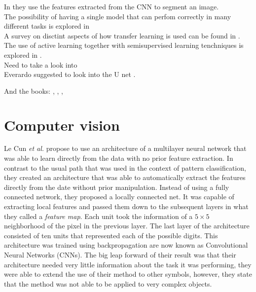 In \cite{DBLP:journals/corr/LongSD14} they use the features extracted from the CNN to segment an image.\\

The possibility of having a single model that can perfom correctly in many different tasks is explored in \cite{DBLP:journals/corr/KaiserGSVPJU17}\\

A survey on disctint aspects of how transfer learning is used can be found in \cite{5288526}.\\

The use of active learning together with semisupervised learning tenchniques is explored in \cite{7956153}.\\

Need to take a look into \cite{DBLP:journals/corr/ChenPKMY14}\\

Everardo suggested to look into the U net \cite{DBLP:journals/corr/RonnebergerFB15}.


And the books: \cite{canty2014image}, \cite{richards2013remote}, \cite{tso2009classification} ,\cite{hastie01statisticallearning}




\section{Computer vision}

Le Cun \textit{et al.} \cite{119325} propose to use an architecture of a multilayer neural network that was able to learn directly from the data with no prior feature extraction. In contrast to the usual path that was used in the context of pattern classification, they created an architecture that was able to automatically extract the features directly from the date without prior manipulation. Instead of using a fully connected network, they proposed a locally connected net. It was capable of extracting local features and passed them down to the subsequent layers in what they called a \textit{feature map}. Each unit took the information of a $5\times 5$ neighborhood of the pixel in the previous layer. The last layer of the architecture consisted of ten units that represented each of the possible digits. This architecture was trained using backpropagation are now known as Convolutional Neural Networks (CNNs). The big leap forward of their result was that their architecture needed very little information about the task it was performing, they were able to extend the use of their method to other symbols, however, they state that the method was not able to be applied to very complex objects.\\

